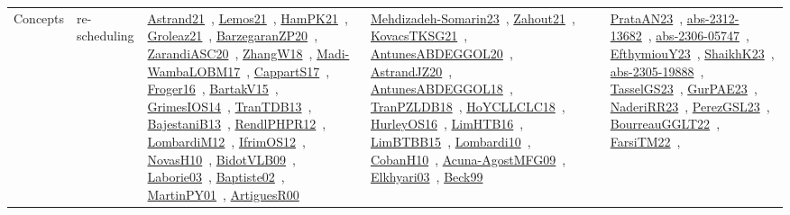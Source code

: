 {\begin{longtable}{lp{3cm}>{\raggedright\arraybackslash}p{6cm}>{\raggedright\arraybackslash}p{6cm}>{\raggedright\arraybackslash}p{8cm}}
Concepts & re-scheduling & \href{works/Astrand21.pdf}{Astrand21}~\cite{Astrand21}, \href{works/Lemos21.pdf}{Lemos21}~\cite{Lemos21}, \href{works/HamPK21.pdf}{HamPK21}~\cite{HamPK21}, \href{works/Groleaz21.pdf}{Groleaz21}~\cite{Groleaz21}, \href{works/BarzegaranZP20.pdf}{BarzegaranZP20}~\cite{BarzegaranZP20}, \href{works/ZarandiASC20.pdf}{ZarandiASC20}~\cite{ZarandiASC20}, \href{works/ZhangW18.pdf}{ZhangW18}~\cite{ZhangW18}, \href{works/Madi-WambaLOBM17.pdf}{Madi-WambaLOBM17}~\cite{Madi-WambaLOBM17}, \href{works/CappartS17.pdf}{CappartS17}~\cite{CappartS17}, \href{works/Froger16.pdf}{Froger16}~\cite{Froger16}, \href{works/BartakV15.pdf}{BartakV15}~\cite{BartakV15}, \href{works/GrimesIOS14.pdf}{GrimesIOS14}~\cite{GrimesIOS14}, \href{works/TranTDB13.pdf}{TranTDB13}~\cite{TranTDB13}, \href{works/BajestaniB13.pdf}{BajestaniB13}~\cite{BajestaniB13}, \href{works/RendlPHPR12.pdf}{RendlPHPR12}~\cite{RendlPHPR12}, \href{works/LombardiM12.pdf}{LombardiM12}~\cite{LombardiM12}, \href{works/IfrimOS12.pdf}{IfrimOS12}~\cite{IfrimOS12}, \href{works/NovasH10.pdf}{NovasH10}~\cite{NovasH10}, \href{works/BidotVLB09.pdf}{BidotVLB09}~\cite{BidotVLB09}, \href{works/Laborie03.pdf}{Laborie03}~\cite{Laborie03}, \href{works/Baptiste02.pdf}{Baptiste02}~\cite{Baptiste02}, \href{works/MartinPY01.pdf}{MartinPY01}~\cite{MartinPY01}, \href{works/ArtiguesR00.pdf}{ArtiguesR00}~\cite{ArtiguesR00} & \href{works/Mehdizadeh-Somarin23.pdf}{Mehdizadeh-Somarin23}~\cite{Mehdizadeh-Somarin23}, \href{works/Zahout21.pdf}{Zahout21}~\cite{Zahout21}, \href{works/KovacsTKSG21.pdf}{KovacsTKSG21}~\cite{KovacsTKSG21}, \href{works/AntunesABDEGGOL20.pdf}{AntunesABDEGGOL20}~\cite{AntunesABDEGGOL20}, \href{works/AstrandJZ20.pdf}{AstrandJZ20}~\cite{AstrandJZ20}, \href{works/AntunesABDEGGOL18.pdf}{AntunesABDEGGOL18}~\cite{AntunesABDEGGOL18}, \href{works/TranPZLDB18.pdf}{TranPZLDB18}~\cite{TranPZLDB18}, \href{works/HoYCLLCLC18.pdf}{HoYCLLCLC18}~\cite{HoYCLLCLC18}, \href{works/HurleyOS16.pdf}{HurleyOS16}~\cite{HurleyOS16}, \href{works/LimHTB16.pdf}{LimHTB16}~\cite{LimHTB16}, \href{works/LimBTBB15.pdf}{LimBTBB15}~\cite{LimBTBB15}, \href{works/Lombardi10.pdf}{Lombardi10}~\cite{Lombardi10}, \href{works/CobanH10.pdf}{CobanH10}~\cite{CobanH10}, \href{works/Acuna-AgostMFG09.pdf}{Acuna-AgostMFG09}~\cite{Acuna-AgostMFG09}, \href{works/Elkhyari03.pdf}{Elkhyari03}~\cite{Elkhyari03}, \href{works/Beck99.pdf}{Beck99}~\cite{Beck99} & \href{works/PrataAN23.pdf}{PrataAN23}~\cite{PrataAN23}, \href{works/abs-2312-13682.pdf}{abs-2312-13682}~\cite{abs-2312-13682}, \href{works/abs-2306-05747.pdf}{abs-2306-05747}~\cite{abs-2306-05747}, \href{works/EfthymiouY23.pdf}{EfthymiouY23}~\cite{EfthymiouY23}, \href{works/ShaikhK23.pdf}{ShaikhK23}~\cite{ShaikhK23}, \href{works/abs-2305-19888.pdf}{abs-2305-19888}~\cite{abs-2305-19888}, \href{works/TasselGS23.pdf}{TasselGS23}~\cite{TasselGS23}, \href{works/GurPAE23.pdf}{GurPAE23}~\cite{GurPAE23}, \href{works/NaderiRR23.pdf}{NaderiRR23}~\cite{NaderiRR23}, \href{works/PerezGSL23.pdf}{PerezGSL23}~\cite{PerezGSL23}, \href{works/BourreauGGLT22.pdf}{BourreauGGLT22}~\cite{BourreauGGLT22}, \href{works/FarsiTM22.pdf}{FarsiTM22}~\cite{FarsiTM22}, 
\end{longtable}}
